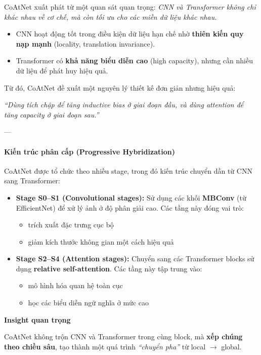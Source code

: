 CoAtNet xuất phát từ một quan sát quan trọng:  
\textit{CNN và Transformer không chỉ khác nhau về cơ chế, mà còn tối ưu cho các miền dữ liệu khác nhau.}
\begin{itemize}
	\item CNN hoạt động tốt trong điều kiện dữ liệu hạn chế nhờ \textbf{thiên kiến quy nạp mạnh} (locality, translation invariance).
	\item Transformer có \textbf{khả năng biểu diễn cao} (high capacity), nhưng cần nhiều dữ liệu để phát huy hiệu quả.
\end{itemize}

Từ đó, CoAtNet đề xuất một nguyên lý thiết kế đơn giản nhưng hiệu quả:
\begin{center}
	\textit{“Dùng tích chập để tăng inductive bias ở giai đoạn đầu, và dùng attention để tăng capacity ở giai đoạn sau.”}
\end{center}

---

\paragraph{Kiến trúc phân cấp (Progressive Hybridization)}

CoAtNet được tổ chức theo nhiều stage, trong đó kiến trúc chuyển dần từ CNN sang Transformer:

\begin{itemize}
	\item \textbf{Stage S0–S1 (Convolutional stages):}  
	Sử dụng các khối \textbf{MBConv} (từ EfficientNet) để xử lý ảnh ở độ phân giải cao.  
	Các tầng này đóng vai trò:
	\begin{itemize}
		\item trích xuất đặc trưng cục bộ
		\item giảm kích thước không gian một cách hiệu quả
	\end{itemize}
	
	\item \textbf{Stage S2–S4 (Attention stages):}  
	Chuyển sang các Transformer blocks sử dụng \textbf{relative self-attention}.  
	Các tầng này tập trung vào:
	\begin{itemize}
		\item mô hình hóa quan hệ toàn cục
		\item học các biểu diễn ngữ nghĩa ở mức cao
	\end{itemize}
\end{itemize}

\begin{mdframed}[style=infobox]
	\textbf{Insight quan trọng}
	
	CoAtNet không trộn CNN và Transformer trong cùng block, mà \textbf{xếp chúng theo chiều sâu},  
	tạo thành một quá trình \textit{“chuyển pha”} từ local $\rightarrow$ global.
\end{mdframed}

